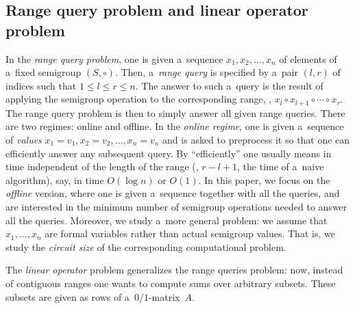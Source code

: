 \documentclass{toc}
\begin{document}
%
%
%

%
%


%
%
\subsection{Range query problem and linear operator problem}
%
%
In the \emph{range query problem},
one is given
a~sequence $x_1, x_2, \dotsc, x_n$ of
elements of a~fixed semigroup $(S, \circ)$.
Then, a~\emph{range query} is
specified by a~pair %
$(l,r)$ of indices  %
such that $1 \le l \le r \le n$.
The answer to such a~query is the result of applying the semigroup
operation to the
corresponding range, \ie, $x_l \circ x_{l+1} \circ \dotsb \circ x_r$.
%
%
The range query problem
is then to simply answer all given range
queries.
There are two
regimes: online and offline. In the \emph{online regime}, one is given
a~sequence of \emph{values}
$x_1=v_1, x_2=v_2, \dotsc, x_n=v_n$ and is asked to preprocess
it %
so that one can   %
%
efficiently answer  %
any subsequent query.
By ``efficiently'' one usually
means in time independent of the length of the range
(\ie, $r-l+1$, the time
of a~naive algorithm), say, in time $O(\log n)$ or $O(1)$.
In this paper, we
focus on the \emph{offline} version, where one is given a~sequence
together with
all the queries, and are interested in the minimum number of
semigroup
operations needed to answer all the queries. Moreover, we study
a~more general
problem: we assume that $x_1, \dotsc, x_n$ are formal variables
rather than
actual semigroup values. That is, we study the \emph{circuit size} of
the corresponding
computational problem.

The \emph{linear operator} problem generalizes the range
queries problem: now, instead of contiguous ranges one wants
to compute sums over arbitrary subsets. These subsets are
given as rows of a~$0/1$-matrix~$A$.  %
\end{document}

